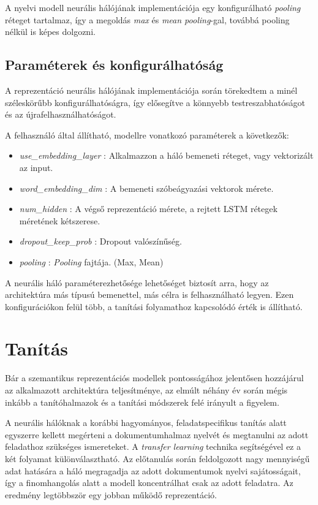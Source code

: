 A nyelvi modell neurális hálójának implementációja egy konfigurálható \textit{pooling} réteget tartalmaz, így a megoldás \textit{max} és \textit{mean pooling}-gal, továbbá pooling nélkül is képes dolgozni.

\subsection{Paraméterek és konfigurálhatóság}

A reprezentáció neurális hálójának implementációja során törekedtem a minél széleskörűbb konfigurálhatóságra, így elősegítve a könnyebb testreszabhatóságot és az újrafelhasználhatóságot. 

A felhasználó által állítható, modellre vonatkozó paraméterek a következők:
\begin{itemize}
	\item \textit{use\_embedding\_layer} : Alkalmazzon a háló bemeneti réteget, vagy vektorizált az input.
	\item \textit{word\_embedding\_dim} : A bemeneti szóbeágyazási vektorok mérete.
	\item \textit{num\_hidden} : A végső reprezentáció mérete, a rejtett LSTM rétegek méretének kétszerese.
	\item \textit{dropout\_keep\_prob} : Dropout valószínűség.
	\item \textit{pooling} : \textit{Pooling} fajtája. (Max, Mean)	
\end{itemize}

A neurális háló paraméterezhetősége lehetőséget biztosít arra, hogy az architektúra más típusú bemenettel, más célra is felhasználható legyen. Ezen konfigurációkon felül több, a tanítási folyamathoz kapcsolódó érték is állítható.

\section{Tanítás}

Bár a szemantikus reprezentációs modellek pontosságához jelentősen hozzájárul az alkalmazott architektúra teljesítménye, az elmúlt néhány év során mégis inkább a tanítóhalmazok és a tanítási módszerek felé irányult a figyelem.

A neurális hálóknak a korábbi hagyományos, feladatspecifikus tanítás alatt egyszerre kellett megérteni a dokumentumhalmaz nyelvét és megtanulni az adott feladathoz szükséges ismereteket. A \textit{transfer learning} technika segítségével ez a két folyamat különválasztható. Az előtanulás során feldolgozott nagy mennyiségű adat hatására a háló megragadja az adott dokumentumok nyelvi sajátosságait, így a finomhangolás alatt a modell koncentrálhat csak az adott feladatra. Az eredmény legtöbbször egy jobban működő reprezentáció.

